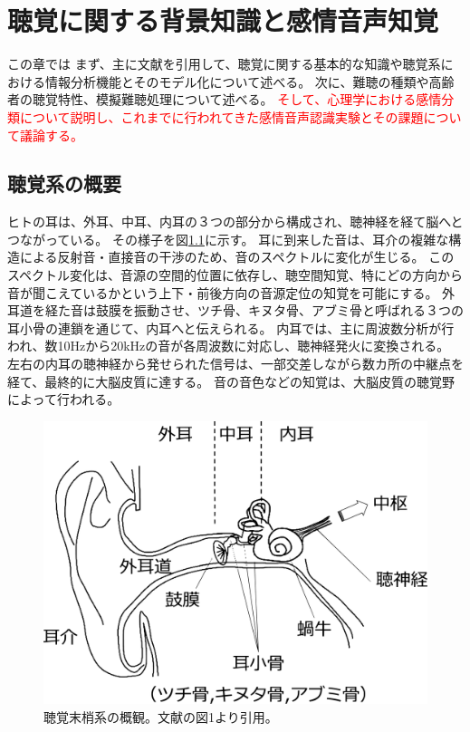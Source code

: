 
\newpage
\chapter{聴覚に関する背景知識と感情音声知覚}
\label{chap:RelatedResearch}

この章では
まず、主に文献\cite{ogushi2019Book, furukawa2021chokaku}を引用して、聴覚に関する基本的な知識や聴覚系における情報分析機能とそのモデル化について述べる。
次に、難聴の種類や高齢者の聴覚特性、模擬難聴処理について述べる。
\textcolor{red}{そして、心理学における感情分類について説明し、これまでに行われてきた感情音声認識実験とその課題について議論する。}


\section{聴覚系の概要}
\label{sec:Auditory}
ヒトの耳は、外耳、中耳、内耳の３つの部分から構成され、聴神経を経て脳へとつながっている。
その様子を図\ref{fig:Hearingsystem}に示す。
耳に到来した音は、耳介の複雑な構造による反射音・直接音の干渉のため、音のスペクトルに変化が生じる。
このスペクトル変化は、音源の空間的位置に依存し、聴空間知覚、特にどの方向から音が聞こえているかという上下・前後方向の音源定位の知覚を可能にする。
外耳道を経た音は鼓膜を振動させ、ツチ骨、キヌタ骨、アブミ骨と呼ばれる３つの耳小骨の連鎖を通じて、内耳へと伝えられる。
内耳では、主に周波数分析が行われ、数10Hzから20kHzの音が各周波数に対応し、聴神経発火に変換される。
左右の内耳の聴神経から発せられた信号は、一部交差しながら数カ所の中継点を経て、最終的に大脳皮質に達する。
音の音色などの知覚は、大脳皮質の聴覚野によって行われる。

\begin{figure}[htbp]
    \vspace{40pt}
    \centering
    \includegraphics[width=0.6\hsize]{Figure/RelatedResearch/furukawa2017auditory.eps}
    \caption{聴覚末梢系の概観。文献\cite{furukawa2017chokaku}の図1より引用。}
    \label{fig:Hearingsystem}
\end{figure}


